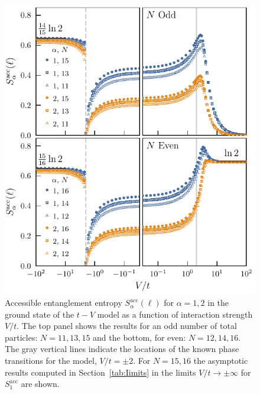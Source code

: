 %
\begin{figure}[h!]
\begin{center}
\includegraphics[scale=1.0]{Images/operationalEntanglementEntropies_SOP5.pdf}
\end{center}
\caption{Accessible entanglement entropy $S_{\alpha}^{\mathrm{acc}}(\ell)$ for $\alpha = 1, 2$ in the ground state of the $t-V$ model as a function of interaction strength $V/t$. The top panel shows the results for an odd number of total particles: $N=11,13,15$ and the bottom, for even: $N=12,14,16$. The gray vertical lines indicate the locations of the known phase transitions for the model, $V/t = \pm 2$. For $N=15,16$ the asymptotic results computed in Section~\ref{tab:Iimits} in the limits $V/t \to \pm \infty$ for $S_{1}^{\mathrm{acc}}$ are shown.}
\label{fig:OEE}
 \end{figure}

